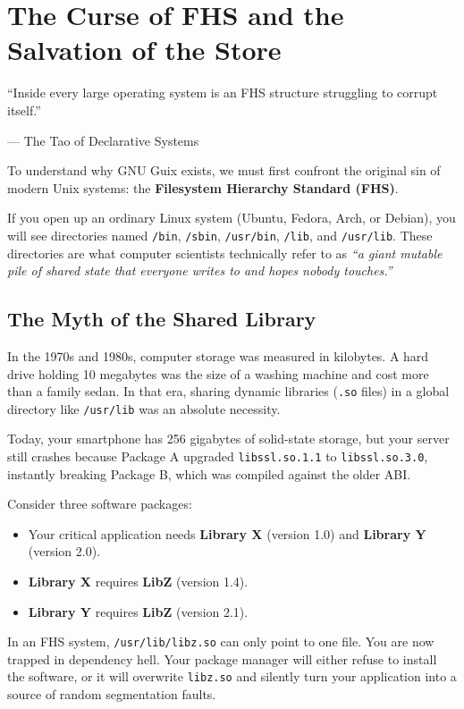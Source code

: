 \chapter{The Curse of FHS and the Salvation of the Store}
\label{chap:curse-of-fhs}

\epigraph{``Inside every large operating system is an FHS structure struggling to corrupt itself.''}{--- The Tao of Declarative Systems}

\noindent
To understand why GNU Guix exists, we must first confront the original sin of modern Unix systems: the \textbf{Filesystem Hierarchy Standard (FHS)}. 

If you open up an ordinary Linux system (Ubuntu, Fedora, Arch, or Debian), you will see directories named \texttt{/bin}, \texttt{/sbin}, \texttt{/usr/bin}, \texttt{/lib}, and \texttt{/usr/lib}. These directories are what computer scientists technically refer to as \emph{``a giant mutable pile of shared state that everyone writes to and hopes nobody touches.''}

\section{The Myth of the Shared Library}

In the 1970s and 1980s, computer storage was measured in kilobytes. A hard drive holding 10 megabytes was the size of a washing machine and cost more than a family sedan. In that era, sharing dynamic libraries (\texttt{.so} files) in a global directory like \texttt{/usr/lib} was an absolute necessity.

Today, your smartphone has 256 gigabytes of solid-state storage, but your server still crashes because Package A upgraded \texttt{libssl.so.1.1} to \texttt{libssl.so.3.0}, instantly breaking Package B, which was compiled against the older ABI.

\begin{tearsbox}
Consider three software packages:
\begin{itemize}
  \item Your critical application needs \textbf{Library X} (version 1.0) and \textbf{Library Y} (version 2.0).
  \item \textbf{Library X} requires \textbf{LibZ} (version 1.4).
  \item \textbf{Library Y} requires \textbf{LibZ} (version 2.1).
\end{itemize}
In an FHS system, \texttt{/usr/lib/libz.so} can only point to one file. You are now trapped in dependency hell. Your package manager will either refuse to install the software, or it will overwrite \texttt{libz.so} and silently turn your application into a source of random segmentation faults.
\end{tearsbox}

